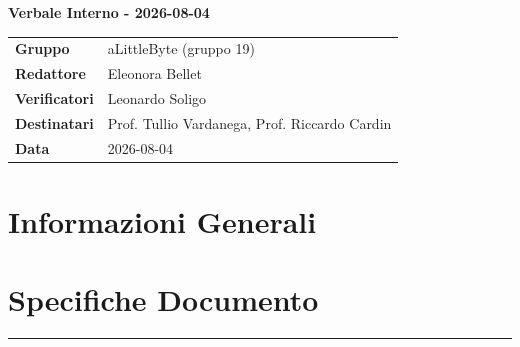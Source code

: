 \documentclass[a4paper,12pt]{article}
\begin{document}
\thispagestyle{firstpage}

\vspace*{0.5cm}

\begin{center}
    {\LARGE \textbf{Verbale Interno - 2026-08-04}}
\end{center}

\vspace{1.5cm}

\begin{center}
    \renewcommand{\arraystretch}{1.3}
    \begin{tcolorbox}[
        width=0.92\textwidth,
        colback=gray!6,
        colframe=gray!45,
        boxrule=0.5pt,
        arc=2mm,
        boxsep=0pt,
        left=8pt, right=8pt, top=8pt, bottom=8pt
    ]
        \begin{tabularx}{\linewidth}{>{\bfseries}p{3.5cm} X}
            Gruppo      & aLittleByte (gruppo 19) \\
            Redattore   & Eleonora Bellet \\
            Verificatori & Leonardo Soligo\\
            Destinatari & Prof. Tullio Vardanega, Prof. Riccardo Cardin \\
            Data        & 2026-08-04\\
        \end{tabularx}
    \end{tcolorbox}
\end{center}

\newpage

\tableofcontents
\newpage
\section{Informazioni Generali}
\section*{Specifiche Documento}
\hrule
\vspace{1cm}
\end{document}
